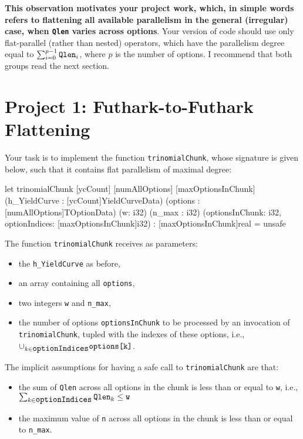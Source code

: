 \documentclass[a4paper,11pt]{article}
\begin{document}
\textbf{This observation motivates your project work, which, in simple words
refers to flattening all available parallelism in the general 
(irregular) case, when {\tt Qlen} varies across options}. Your
version of code should use only flat-parallel (rather than nested) operators,
which have the parallelism degree equal to $\sum_{i=0}^{p-1} \mbox{\tt Qlen}_i$,
where $p$ is the number of options. I recommend that both groups 
read the next section.

\section{Project 1: Futhark-to-Futhark Flattening}

Your task is to implement the function {\tt trinomialChunk},
whose signature is given below, such that it contains flat
parallelism of maximal degree:

\begin{fancycode}
let trinomialChunk [ycCount] [numAllOptions] [maxOptionsInChunk]
                   (h_YieldCurve : [ycCount]YieldCurveData)
                   (options : [numAllOptions]TOptionData) 
                   (w: i32)
                   (n_max : i32)
                   (optionsInChunk: i32, optionIndices: [maxOptionsInChunk]i32)
                 : [maxOptionsInChunk]real = unsafe
\end{fancycode}

The function {\tt trinomialChunk} receives as parameters:
\begin{itemize}
    \item the {\tt h\_YieldCurve} as before,
    \item an array containing all {\tt options},
    \item two integers {\tt w} and {\tt n\_max},
    \item the number of options {\tt optionsInChunk} to 
            be processed by an invocation of 
            {\tt trinomialChunk}, tupled with the
            indexes of these options, i.e., 
            $\cup_{k\in\mbox{\tt optionIndices}} \mbox{\tt options[k]}$.
\end{itemize}

The implicit assumptions for having a safe call to {\tt trinomialChunk} are that:
\begin{itemize}
    \item the sum of {\tt Qlen} across all options in the chunk is less than
            or equal to {\tt w}, i.e.,\\ 
            $\sum_{k\in\mbox{\tt optionIndices}}\mbox{\tt Qlen}_k \leq \mbox{\tt w}$
    \item the maximum value of {\tt n} across all options in the chunk is less than
            or equal to {\tt n\_max}.
\end{itemize}
\end{document}

